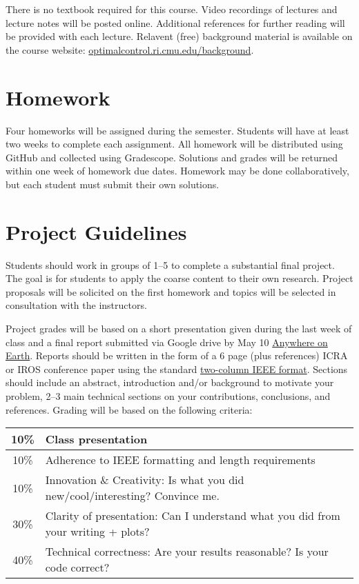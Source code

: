 \documentclass[11pt,letterpaper]{article}
\begin{document}
There is no textbook required for this course. Video recordings of lectures and lecture notes will be posted online. Additional references for further reading will be provided with each lecture. Relavent (free) background material is available on the course website: \href{https://optimalcontrol.ri.cmu.edu/background/}{optimalcontrol.ri.cmu.edu/background}.

\section*{Homework}

Four homeworks will be assigned during the semester. Students will have at least two weeks to complete each assignment. All homework will be distributed using GitHub and collected using Gradescope. Solutions and grades will be returned within one week of homework due dates. Homework may be done collaboratively, but each student must submit their own solutions.


\section*{Project Guidelines}

Students should work in groups of 1--5 to complete a substantial final project. The goal is for students to apply the coarse content to their own research. Project proposals will be solicited on the first homework and topics will be selected in consultation with the instructors.

\medskip
\noindent
Project grades will be based on a short presentation given during the last week of class and a final report submitted via Google drive by May 10 \href{https://time.is/Anywhere_on_Earth}{Anywhere on Earth}. Reports should be written in the form of a 6 page (plus references) ICRA or IROS conference paper using the standard \href{https://www.ieee.org/conferences/publishing/templates.html}{two-column IEEE format}. Sections should include an abstract, introduction and/or background to motivate your problem, 2--3 main technical sections on your contributions, conclusions, and references. Grading will be based on the following criteria:
\newline
\newline
\begin{tabular}{|c|l|}
\hline
10\% & Class presentation \\
\hline
10\% & Adherence to IEEE formatting and length requirements \\
\hline
10\% & Innovation \& Creativity: Is what you did new/cool/interesting? Convince me. \\
\hline
30\% & Clarity of presentation: Can I understand what you did from your writing + plots? \\
\hline
40\% & Technical correctness: Are your results reasonable? Is your code correct? \\
\hline	
\end{tabular}
\end{document}

